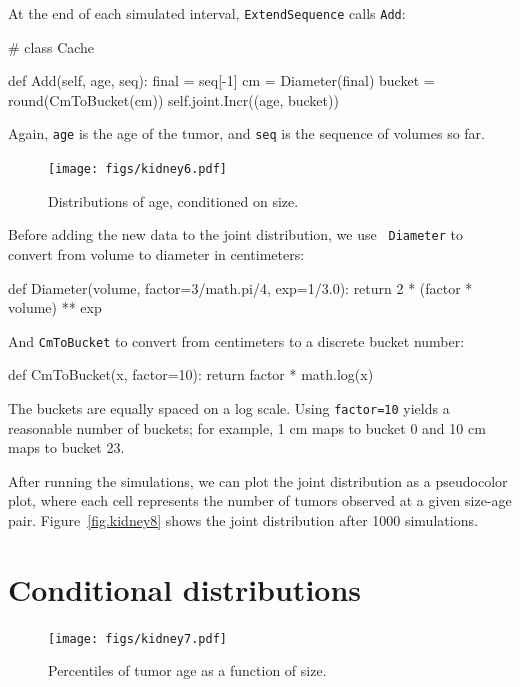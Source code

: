 \documentclass[12pt]{book}
\theoremstyle{exercise}
\begin{document}
At the end of each simulated interval, {\tt ExtendSequence} calls
{\tt Add}:

\begin{code}
# class Cache

    def Add(self, age, seq):
        final = seq[-1]
        cm = Diameter(final)
        bucket = round(CmToBucket(cm))
        self.joint.Incr((age, bucket))
\end{code}

Again, {\tt age} is the age of the tumor, and {\tt seq} is the
sequence of volumes so far.

\begin{figure}
\centerline{\texttt{[image: figs/kidney6.pdf]}}
\caption{Distributions of age, conditioned on size.}
\label{fig.kidney6}
\end{figure}

Before adding the new data to the joint distribution, we use {\tt
  Diameter} to convert from volume to diameter in centimeters:

\begin{code}
def Diameter(volume, factor=3/math.pi/4, exp=1/3.0):
    return 2 * (factor * volume) ** exp
\end{code}

And
{\tt CmToBucket} to convert from centimeters to a discrete bucket
number:

\begin{code}
def CmToBucket(x, factor=10):
    return factor * math.log(x)
\end{code}

The buckets are equally spaced on a log scale.  Using {\tt factor=10}
yields a reasonable number of buckets; for example,
1 cm maps to bucket 0 and 10 cm maps to bucket 23.

After running the simulations, we can plot the joint distribution
as a pseudocolor plot, where each cell represents the number of
tumors observed at a given size-age pair.
Figure~\ref{fig.kidney8} shows the joint distribution after 1000
simulations.



\section{Conditional distributions}

\begin{figure}
\centerline{\texttt{[image: figs/kidney7.pdf]}}
\caption{Percentiles of tumor age as a function of size.}
\label{fig.kidney7}
\end{figure}
\end{document}
